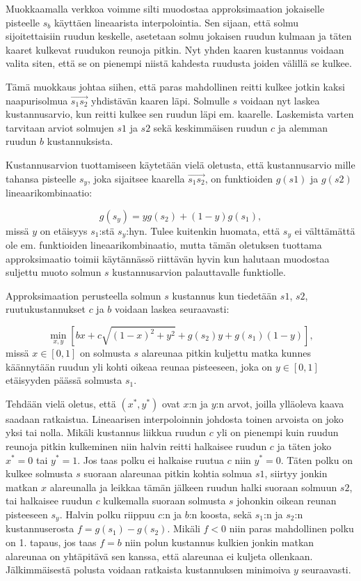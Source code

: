 \documentclass[finnish]{tktltiki2}
\theoremstyle{definition}
\theoremstyle{remark}
\begin{document}
Muokkaamalla verkkoa voimme silti muodostaa approksimaation jokaiselle pisteelle \(s_b\) käyttäen lineaarista interpolointia. Sen sijaan, että solmu sijoitettaisiin ruudun keskelle, asetetaan solmu jokaisen ruudun kulmaan ja täten kaaret kulkevat ruudukon reunoja pitkin. Nyt yhden kaaren kustannus voidaan valita siten, että se on pienempi niistä kahdesta ruudusta joiden välillä se kulkee.

Tämä muokkaus johtaa siihen, että paras mahdollinen reitti kulkee jotkin kaksi naapurisolmua $\overrightarrow{s_1s_2}$ yhdistävän kaaren läpi. Solmulle \(s\) voidaan nyt laskea kustannusarvio, kun reitti kulkee sen ruudun läpi em. kaarelle. Laskemista varten tarvitaan arviot solmujen \(s1\) ja \(s2\) sekä keskimmäisen ruudun \(c\) ja alemman ruudun \(b\) kustannuksista.

Kustannusarvion tuottamiseen käytetään vielä oletusta, että kustannusarvio mille tahansa pisteelle \(s_y\), joka sijaitsee kaarella $\overrightarrow{s_1s_2}$, on funktioiden \(g(s1)\) ja \(g(s2)\) lineaarikombinaatio:

\[g(s_y) = yg(s_2)+(1-y)g(s_1),\]
missä \(y\) on etäisyys \(s_1\):stä \(s_y\):hyn. Tulee kuitenkin huomata, että \(s_y\) ei välttämättä ole em. funktioiden lineaarikombinaatio, mutta tämän oletuksen tuottama approksimaatio toimii käytännässö riittävän hyvin kun halutaan muodostaa suljettu muoto solmun \(s\) kustannusarvion palauttavalle funktiolle.

Approksimaation perusteella solmun \(s\) kustannus kun tiedetään \(s1\), \(s2\), ruutukustannukset \(c\) ja \(b\) voidaan laskea seuraavasti:

\[\min_{x,y}[bx+c\sqrt{(1-x)^2+y^2}+g(s_2)y+g(s_1)(1-y)],\]
missä $x \in [0,1]$ on solmusta $s$ alareunaa pitkin kuljettu matka kunnes käännytään ruudun yli kohti oikeaa reunaa pisteeseen, joka on $y \in [0,1]$ etäisyyden päässä solmusta $s_1$.

Tehdään vielä oletus, että \((x^*, y^*)\) ovat \(x\):n ja \(y\):n arvot, joilla ylläoleva kaava saadaan ratkaistua. Lineaarisen interpoloinnin johdosta toinen arvoista on joko yksi tai nolla. Mikäli kustannus liikkua ruudun \(c\) yli on pienempi kuin ruudun reunoja pitkin kulkeminen niin halvin reitti halkaisee ruudun \(c\) ja täten joko \(x^* = 0\) tai \(y^* = 1\). Jos taas polku ei halkaise ruutua \(c\) niin \(y^* = 0\). Täten polku on kulkee solmusta \(s\) suoraan alareunaa pitkin kohtia solmua \(s1\), siirtyy jonkin matkan \(x\) alareunalla ja leikkaa tämän jälkeen ruudun halki suoraan solmuun \(s2\), tai halkaisee ruudun \(c\) kulkemalla suoraan solmusta \(s\) johonkin oikean reunan pisteeseen \(s_y\). Halvin polku riippuu \(c\):n ja \(b\):n koosta, sekä \(s_1\):n ja \(s_2\):n kustannuserosta \(f = g(s_1) - g(s_2)\). Mikäli \(f < 0\) niin paras mahdollinen polku on 1. tapaus, jos taas \(f = b\) niin polun kustannus kulkien jonkin matkan alareunaa on yhtäpitävä sen kanssa, että alareunaa ei kuljeta ollenkaan. Jälkimmäisestä polusta voidaan ratkaista kustannuksen minimoiva \(y\) seuraavasti.
\end{document}
